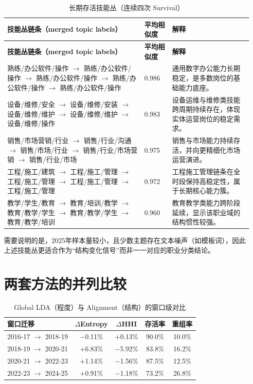 \documentclass[12pt, a4paper, fontset=none]{ctexart}
\begin{document}
\begin{longtable}{p{}p{}p{}}
\caption{长期存活技能丛（连续四次 Survival）}\\
\toprule
\textbf{技能丛链条（merged topic labels）} & \textbf{平均相似度} & \textbf{解释} \\
\midrule
\endfirsthead
\toprule
\textbf{技能丛链条（merged topic labels）} & \textbf{平均相似度} & \textbf{解释} \\
\midrule
\endhead
熟练/办公软件/操作 $\rightarrow$ 熟练/办公软件/操作 $\rightarrow$ 熟练/办公软件/操作 $\rightarrow$ 熟练/办公软件/操作 $\rightarrow$ 熟练/办公软件/操作 & 0.986 & 通用数字办公能力长期稳定，是多数岗位的基础能力底座。 \\
设备/维修/安全 $\rightarrow$ 设备/维修/安装 $\rightarrow$ 设备/维修/维护 $\rightarrow$ 设备/维修/维护 $\rightarrow$ 设备/维修/操作 & 0.983 & 设备运维与维修类技能跨周期持续存在，体现实体运营岗位的稳定需求。 \\
销售/市场营销/行业 $\rightarrow$ 销售/行业/沟通 $\rightarrow$ 销售/市场/行业 $\rightarrow$ 销售/行业/市场营销 $\rightarrow$ 销售/行业/市场 & 0.975 & 销售与市场能力持续存活，并向更精细化市场运营演进。 \\
工程/施工/建筑 $\rightarrow$ 工程/施工/管理 $\rightarrow$ 工程/施工/管理 $\rightarrow$ 工程/施工/管理 $\rightarrow$ 工程/施工/管理 & 0.972 & 工程施工管理链条在全时段保持高稳定性，属于长期核心能力簇。 \\
教学/学生/教育 $\rightarrow$ 教育/培训/教学 $\rightarrow$ 教育/教学/学生 $\rightarrow$ 教育/教学/学生 $\rightarrow$ 教育/教学/培训 & 0.960 & 教育教学类能力跨阶段延续，显示该职业域的结构惯性较强。 \\
\bottomrule
\end{longtable}

\noindent 需要说明的是，2025年样本量较小，且少数主题存在文本噪声（如模板词），因此上述技能丛更适合作为“结构变化信号”而非一一对应的职业分类结论。

\section{两套方法的并列比较}

\begin{table}[h]
\centering
\caption{Global LDA（程度）与 Alignment（结构）的窗口级对比}
\begin{tabular}{p{}cccc}
\toprule
\textbf{窗口迁移} & \textbf{$\Delta$Entropy} & \textbf{$\Delta$HHI} & \textbf{存活率} & \textbf{重组率} \\
\midrule
2016-17 $\rightarrow$ 2018-19 & $-$0.11\% & $+$0.13\% & 90.0\% & 10.0\% \\
2018-19 $\rightarrow$ 2020-21 & $+$6.83\% & $-$5.92\% & 83.8\% & 16.2\% \\
2020-21 $\rightarrow$ 2022-23 & $+$1.14\% & $-$1.56\% & 87.5\% & 12.5\% \\
2022-23 $\rightarrow$ 2024-25 & $+$0.91\% & $-$1.18\% & 73.2\% & 26.8\% \\
\bottomrule
\end{tabular}
\end{table}
\end{document}
